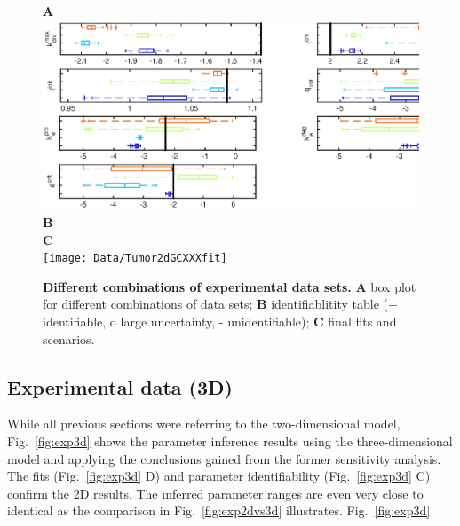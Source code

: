 \documentclass[10pt,letterpaper]{article}
\begin{document}
\begin{figure}[htbp]
\textbf{A}\\
\includegraphics[width=\textwidth]{Data/Tumor2dGCXXXindependentBoxplots}\\
\textbf{B}\\


\textbf{C}\\
\texttt{[image: Data/Tumor2dGCXXXfit]}
\caption{{\bf Different combinations of experimental data sets.}
\textbf{A} box plot for different combinations of data sets; \textbf{B} identifiablitity table (+ identifiable, o large uncertainty, - unidentifiable); \textbf{C} final fits and scenarios.}
\label{fig:exp2d}
\end{figure}

\subsection*{Experimental data (3D)}
While all previous sections were referring to the two-dimensional model, Fig.~\ref{fig:exp3d} shows the parameter inference results using the three-dimensional model and applying the conclusions gained from the former sensitivity analysis. The fits (Fig.~\ref{fig:exp3d} D) and parameter identifiability (Fig.~\ref{fig:exp3d} C) confirm the 2D results. The inferred parameter ranges are even very close to identical as the comparison in Fig.~\ref{fig:exp2dvs3d} illustrates. 
Fig.~\ref{fig:exp3d} 
\end{document}
